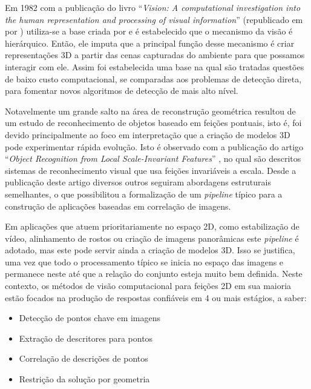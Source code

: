 Em 1982 com a publicação do livro ``\textit{Vision: A computational investigation into the human representation and processing of visual information}'' (republicado em \citeyear{marr2010vision} por ) utiliza-se a base criada por  e é estabelecido que o mecanismo da visão é hierárquico. Então, ele imputa que a principal função desse mecanismo é criar representações 3D a partir das cenas capturadas do ambiente para que possamos interagir com ele. Assim foi estabelecida uma base na qual são tratadas questões de baixo custo computacional, se comparadas aos problemas de detecção direta, para fomentar novos algoritmos de detecção de mais alto nível. 

Notavelmente um grande salto na área de reconstrução geométrica resultou de um estudo de reconhecimento de objetos baseado em feições pontuais, isto é, foi devido principalmente ao foco em interpretação que a criação de modelos 3D pode experimentar rápida evolução. Isto é observado com a publicação do artigo ``\textit{Object Recognition from Local Scale-Invariant Features}'' \cite{SIFT1999}, no qual são descritos sistemas de reconhecimento visual que usa feições invariáveis a escala. Desde a publicação deste artigo diversos outros seguiram abordagens estruturais semelhantes, o que possibilitou a formalização de um \textit{pipeline} típico para a construção de aplicações baseadas em correlação de imagens.

Em aplicações que atuem prioritariamente no espaço 2D, como estabilização de vídeo, alinhamento de rostos ou criação de imagens panorâmicas este \textit{pipeline} é adotado, mas este pode servir ainda a criação de modelos 3D. Isso se justifica, uma vez que todo o processamento típico se inicia no espaço das imagens e permanece neste até que a relação do conjunto esteja muito bem definida. Neste contexto, os métodos de visão computacional para feições 2D em sua maioria estão focados na produção de respostas confiáveis em 4 ou mais estágios, a saber:

\begin{itemize}
    \item Detecção de pontos chave em imagens
    \item Extração de descritores para pontos 
    \item Correlação de descrições de pontos
    \item Restrição da solução por geometria
\end{itemize}

